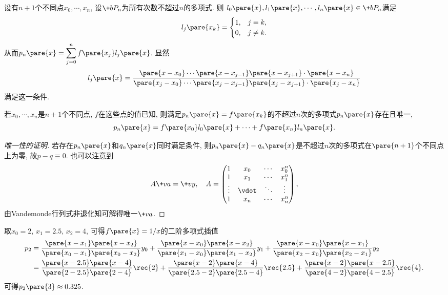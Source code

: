 \documentclass[hidelinks]{ctexart}
\begin{document}
设有$n+1$个不同点$x_0,\cdots,x_n$, 设$\+bP_n$为所有次数不超过$n$的多项式. 则 $l_0\pare{x}, l_1\pare{x},\cdots,l_n\pare{x}\in \+bP_n$满足
\[ l_j\pare{x_k} = \begin{cases}
    1,  & j = k, \\
    0,  & j \neq k.
\end{cases} \]
从而$\displaystyle p_n\pare{x} = \sum_{j=0}^n f\pare{x_j}l_j\pare{x}$. 显然
\[ l_j\pare{x} = \frac{\pare{x-x_0}\cdots\pare{x-x_{j-1}}\pare{x-x_{j+1}}\cdot \pare{x-x_n}}{\pare{x_j-x_0}\cdots\pare{x_j-x_{j-1}}\pare{x_j-x_{j+1}}\cdot \pare{x_j-x_n}} \]
满足这一条件.
\begin{theorem}
    若$x_0,\cdots,x_n$是$n+1$个不同点, $f$在这些点的值已知, 则满足$p_n\pare{x} = f\pare{x_k}$的不超过$n$次的多项式$p_n\pare{x}$存在且唯一,
    \[ p_n\pare{x} = f\pare{x_0}l_0\pare{x} + \cdots + f\pare{x_n}l_n\pare{x}. \]
\end{theorem}
\begin{proof}[唯一性的证明]
    若存在$p_n\pare{x}$和$q_n\pare{x}$同时满足条件, 则$p_n\pare{x} - q_n\pare{x}$是不超过$n$次的多项式在$\pare{n+1}$个不同点上为零, 故$p-q\equiv 0$. 也可以注意到
    \[ A\+va = \+vy,\quad A = \begin{pmatrix}
        1 & x_0 & \cdots & x_0^n \\
        1 & x_1 & \cdots & x_1^n \\
        \vdots & \vdot & \ddots & \vdots \\
        1 & x_n & \cdots & x_n^n
    \end{pmatrix}, \]
    由Vandemonde行列式非退化知可解得唯一$\+va$.
\end{proof}
\begin{sample}
    \begin{ex}
        取$x_0 = 2$, $x_1 = 2.5$, $x_2 = 4$, 可得$f\pare{x} = 1/x$的二阶多项式插值
        \begin{align*}
            p_2 &= \frac{\pare{x-x_1}\pare{x-x_2}}{\pare{x_0-x_1}\pare{x_0-x_2}}y_0 + \frac{\pare{x-x_0}\pare{x-x_2}}{\pare{x_1-x_0}\pare{x_1-x_2}}y_1 + \frac{\pare{x-x_0}\pare{x-x_1}}{\pare{x_2-x_0}\pare{x_2-x_1}}y_2 \\
            &= \frac{\pare{x-2.5}\pare{x-4}}{\pare{2-2.5}\pare{2-4}}\rec{2} + \frac{\pare{x-2}\pare{x-4}}{\pare{2.5-2}\pare{2.5-4}}\rec{2.5} + \frac{\pare{x-2}\pare{x-2.5}}{\pare{4-2}\pare{4-2.5}}\rec{4}.
        \end{align*}
        可得$p_2\pare{3} \approx 0.325$.
    \end{ex}
\end{sample}
\end{document}
